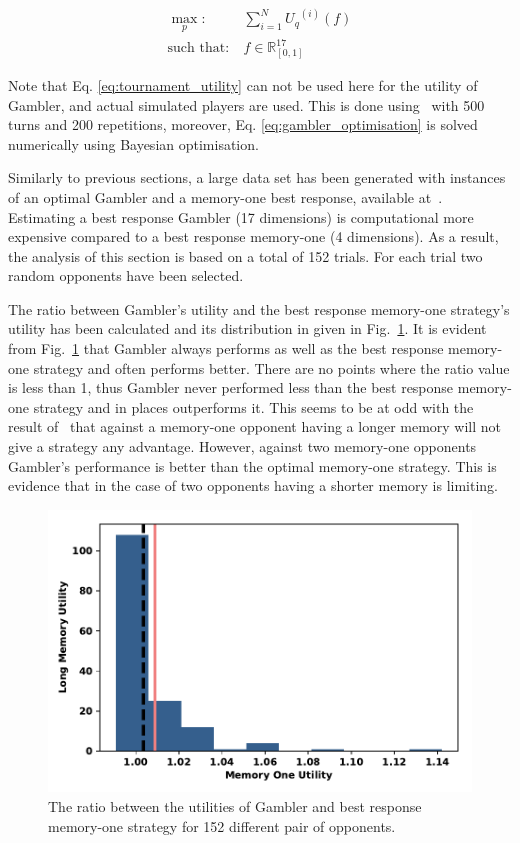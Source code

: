 \documentclass[10pt]{article}
\newcommand{\R}{\mathbb{R}}
\begin{document}
\begin{equation}\label{eq:gambler_optimisation}
    \begin{aligned}
    \max_p: & \ \sum_{i=1} ^ {N} {U_q}^{(i)} (f)
    \\
    \text{such that}: & \ f \in \R_{[0, 1]}^{17}
    \end{aligned}
\end{equation}

Note that Eq. \ref{eq:tournament_utility} can not be used here for the utility
of Gambler, and actual simulated players are used. This is done using~\cite{axelrodproject}
with 500 turns and 200 repetitions, moreover, Eq. \ref{eq:gambler_optimisation}
is solved numerically using Bayesian optimisation.

Similarly to previous sections, a large data set has been generated with
instances of an optimal Gambler and a memory-one best response, available
at~\cite{glynatsi2019}. Estimating a best response Gambler (17 dimensions) is
computational more expensive compared to a best response memory-one (4
dimensions). As a result, the analysis of this section is based on a total of
152 trials. For each trial two random opponents have been selected.

The ratio between Gambler's utility and the best response memory-one strategy's utility has been calculated and its distribution in
given in Fig.~\ref{fig:utilities_gambler_mem_one}.
It is evident from Fig.~\ref{fig:utilities_gambler_mem_one} that
Gambler always performs as well as the best response memory-one strategy and often performs better. There are
no points where the ratio value is less than 1, thus Gambler never performed less
than the best response memory-one strategy and in places outperforms it. This seems to be at odd with the
result of~\cite{Press2012} that against a memory-one opponent having a longer memory
will not give a strategy any
advantage. However, against two memory-one opponents Gambler's performance is better than
the optimal memory-one strategy. This is evidence that in the case of two opponents having a
shorter memory is limiting.

\begin{figure}[!htbp]
    \centering
    \includegraphics[width=.5\textwidth]{img/gambler_performance_against_mem_one.pdf}
    \caption{The ratio between the utilities of Gambler and best response memory-one
    strategy for 152 different pair of opponents.}\label{fig:utilities_gambler_mem_one}
\end{figure}
\end{document}
